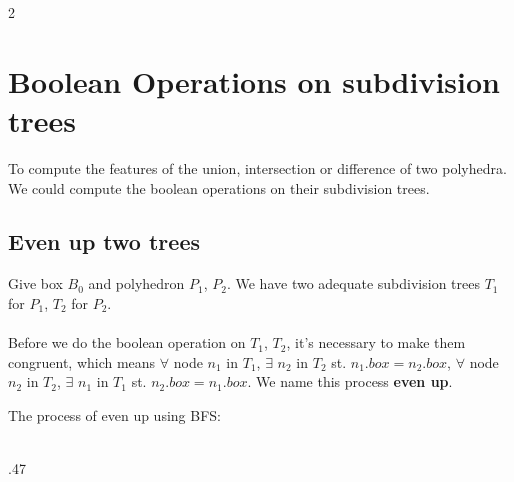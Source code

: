 \documentclass[twoside]{article}
\begin{document}
\begin{multicols}{2}

\section{Boolean Operations on subdivision trees}
To compute the features of the union, intersection or difference of two polyhedra. We could compute the boolean operations on their subdivision trees.
\subsection {Even up two trees}
\indent
Give box $B_0$ and polyhedron $P_1$, $P_2$. We have two adequate subdivision trees $T_1$ for $P_1$, $T_2$ for $P_2$. 
\\
\\
\indent
Before we do the boolean operation on $T_1$, $T_2$, it's necessary to make them congruent, which means $\forall$ node $n_1$ in $T_1$, $\exists$ $n_2$ in $T_2$ st. $n_1.box = n_2.box$, $\forall$ node $n_2$ in $T_2$, $\exists$ $n_1$ in $T_1$ st. $n_2.box = n_1.box$. We name this process \textbf{even up}.

The process of even up using BFS:
\\
\\
\begin{boxedminipage}{.47\textwidth}


\end{boxedminipage}
\end{multicols}
\end{document}
